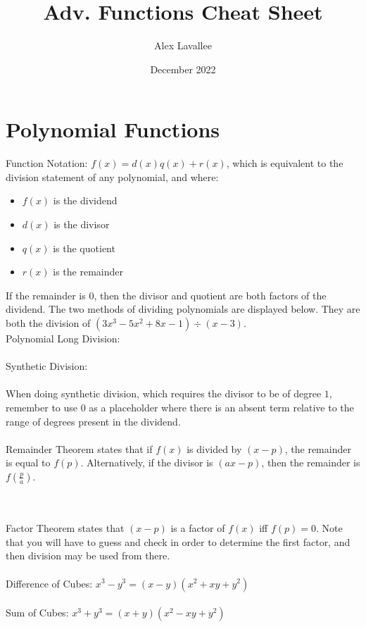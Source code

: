 \documentclass{article}
\title{Adv. Functions Cheat Sheet}
\author{Alex Lavallee }
\date{December 2022}
\begin{document}


\maketitle

\section{Polynomial Functions}
Function Notation: $f(x)=d(x)q(x)+r(x)$, which is equivalent to the division statement of any polynomial, and where: \begin{itemize}
    \item $f(x)$ is the dividend
    \item $d(x)$ is the divisor
    \item $q(x)$ is the quotient
    \item $r(x)$ is the remainder
\end{itemize}

If the remainder is $0$, then the divisor and quotient are both factors of the dividend. The two methods of dividing polynomials are displayed below. They are both the division of $(3x^3-5x^2+8x-1) \div (x-3)$. \\

Polynomial Long Division: 
 \\
\\Synthetic Division:
 \\
\\When doing synthetic division, which requires the divisor to be of degree $1$, remember to use $0$ as a placeholder where there is an absent term relative to the range of degrees present in the dividend. \\ \\

Remainder Theorem states that if $f(x)$ is divided by $(x-p)$, the remainder is equal to $f(p)$. Alternatively, if the divisor is $(ax-p)$, then the remainder is $f(\frac{p}{a})$. \\ \\\

Factor Theorem states that $(x-p)$ is a factor of $f(x)$ iff $f(p)=0$. Note that you will have to guess and check in order to determine the first factor, and then division may be used from there. \\ \\

Difference of Cubes: $x^3-y^3=(x-y)(x^2+xy+y^2)$ \\ \\
Sum of Cubes: $x^3+y^3=(x+y)(x^2-xy+y^2)$ \\ \\
\end{document}
